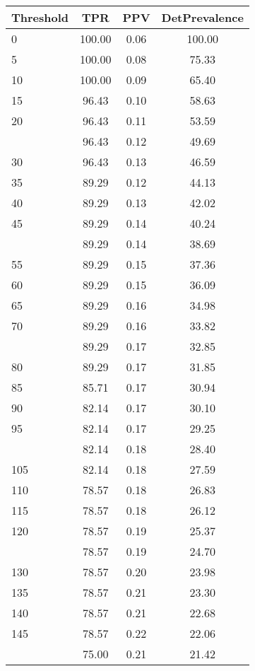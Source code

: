\begin{table}[ht]
\centering
\begin{tabular}{lccc}
  \toprule
Threshold & TPR & PPV & DetPrevalence \\ 
  \midrule
0 & 100.00 & 0.06 & 100.00 \\ 
  5 & 100.00 & 0.08 & 75.33 \\ 
  10 & 100.00 & 0.09 & 65.40 \\ 
  15 & 96.43 & 0.10 & 58.63 \\ 
  20 & 96.43 & 0.11 & 53.59 \\ 
   \addlinespace
25 & 96.43 & 0.12 & 49.69 \\ 
  30 & 96.43 & 0.13 & 46.59 \\ 
  35 & 89.29 & 0.12 & 44.13 \\ 
  40 & 89.29 & 0.13 & 42.02 \\ 
  45 & 89.29 & 0.14 & 40.24 \\ 
   \addlinespace
50 & 89.29 & 0.14 & 38.69 \\ 
  55 & 89.29 & 0.15 & 37.36 \\ 
  60 & 89.29 & 0.15 & 36.09 \\ 
  65 & 89.29 & 0.16 & 34.98 \\ 
  70 & 89.29 & 0.16 & 33.82 \\ 
   \addlinespace
75 & 89.29 & 0.17 & 32.85 \\ 
  80 & 89.29 & 0.17 & 31.85 \\ 
  85 & 85.71 & 0.17 & 30.94 \\ 
  90 & 82.14 & 0.17 & 30.10 \\ 
  95 & 82.14 & 0.17 & 29.25 \\ 
   \addlinespace
100 & 82.14 & 0.18 & 28.40 \\ 
  105 & 82.14 & 0.18 & 27.59 \\ 
  110 & 78.57 & 0.18 & 26.83 \\ 
  115 & 78.57 & 0.18 & 26.12 \\ 
  120 & 78.57 & 0.19 & 25.37 \\ 
   \addlinespace
125 & 78.57 & 0.19 & 24.70 \\ 
  130 & 78.57 & 0.20 & 23.98 \\ 
  135 & 78.57 & 0.21 & 23.30 \\ 
  140 & 78.57 & 0.21 & 22.68 \\ 
  145 & 78.57 & 0.22 & 22.06 \\ 
   \addlinespace
150 & 75.00 & 0.21 & 21.42 \\ 

\end{tabular}
\end{table}
